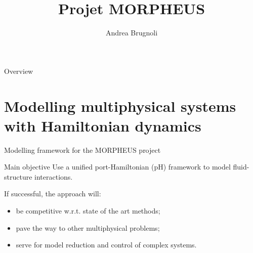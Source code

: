 \documentclass{beamer}
\title{Projet MORPHEUS}
\author{Andrea Brugnoli}
\begin{document}
\begin{frame}[plain]
    \maketitle
\end{frame}

\begin{frame}{Overview}
	\tableofcontents
\end{frame}

\section{Modelling multiphysical systems with Hamiltonian dynamics}

\begin{frame}{Modelling framework for the MORPHEUS project}
	
	\begin{block}{Main objective}
		Use a unified port-Hamiltonian (pH) framework to model fluid-structure interactions.
	\end{block}
	
	If successful, the approach will: 
	\begin{itemize}
		\item be competitive w.r.t. state of the art methods;
		\item pave the way to other multiphysical problems;
		\item serve for model reduction and control of complex systems.
	\end{itemize}
	

\end{frame}
\end{document}

